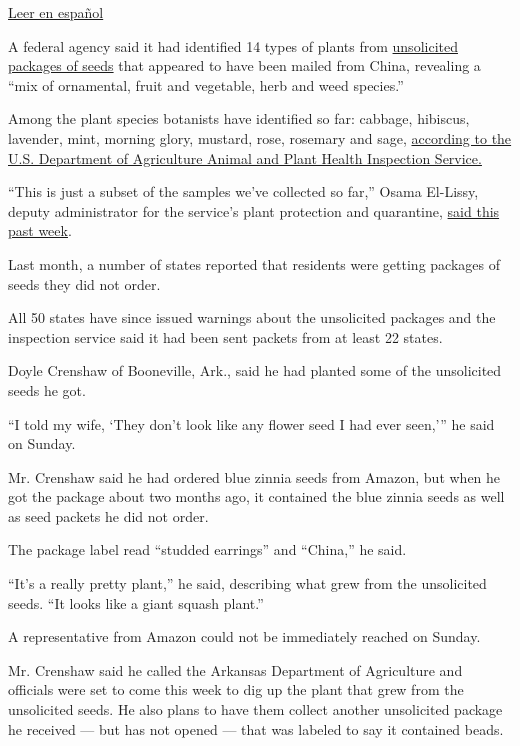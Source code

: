 \href{https://www.nytimes.com/es/2020/08/03/espanol/estados-unidos/semillas-correo-china.html}{Leer
en español}

A federal agency said it had identified 14 types of plants from
\href{https://www.nytimes.com/2020/07/26/us/seeds-from-china-mail.html}{unsolicited
packages of seeds} that appeared to have been mailed from China,
revealing a ``mix of ornamental, fruit and vegetable, herb and weed
species.''

Among the plant species botanists have identified so far: cabbage,
hibiscus, lavender, mint, morning glory, mustard, rose, rosemary and
sage,
\href{https://www.aphis.usda.gov/publications/plant_health/faq-unsolicited-seeds.pdf}{according
to the U.S. Department of Agriculture Animal and Plant Health Inspection
Service.}

``This is just a subset of the samples we've collected so far,'' Osama
El-Lissy, deputy administrator for the service's plant protection and
quarantine,
\href{https://www.usda.gov/media/radio/daily-newsline/2020-07-29/actuality-unsolicited-seeds-are-several-plant-species}{said
this past week}.

Last month, a number of states reported that residents were getting
packages of seeds they did not order.

All 50 states have since issued warnings about the unsolicited packages
and the inspection service said it had been sent packets from at least
22 states.

Doyle Crenshaw of Booneville, Ark., said he had planted some of the
unsolicited seeds he got.

``I told my wife, `They don't look like any flower seed I had ever
seen,''' he said on Sunday.

Mr. Crenshaw said he had ordered blue zinnia seeds from Amazon, but when
he got the package about two months ago, it contained the blue zinnia
seeds as well as seed packets he did not order.

The package label read ``studded earrings'' and ``China,'' he said.

``It's a really pretty plant,'' he said, describing what grew from the
unsolicited seeds. ``It looks like a giant squash plant.''

A representative from Amazon could not be immediately reached on Sunday.

Mr. Crenshaw said he called the Arkansas Department of Agriculture and
officials were set to come this week to dig up the plant that grew from
the unsolicited seeds. He also plans to have them collect another
unsolicited package he received --- but has not opened --- that was
labeled to say it contained beads.

